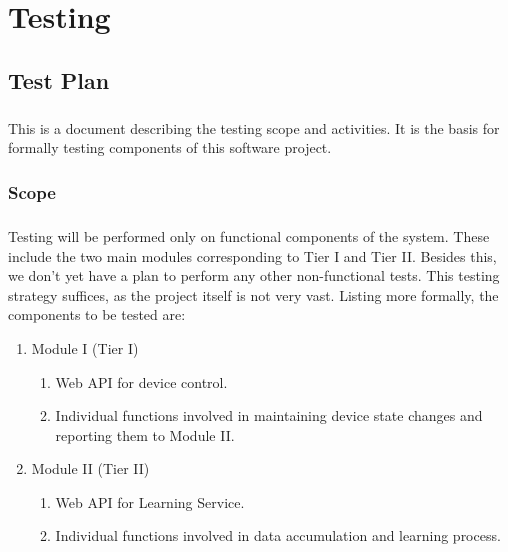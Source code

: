 \chapter{Testing}


\section{Test Plan}
\paragraph{}
This is a document describing the testing scope and activities. It is the basis for formally testing components of this software project.
%
\subsection{Scope}
\paragraph{}
Testing will be performed only on functional components of the system. These include the two main modules corresponding to Tier I and Tier II. Besides this, we don't yet have a plan to perform any other non-functional tests. This testing strategy suffices, as the project itself is not very vast. Listing more formally, the components to be tested are:
\begin{enumerate}
\item Module I (Tier I)
	\begin{enumerate}
	\item Web API for device control.
	\item Individual functions involved in maintaining device state changes and reporting them to Module II.
	\end{enumerate}
\item Module II (Tier II)
	\begin{enumerate}
	\item Web API for Learning Service.
	\item Individual functions involved in data accumulation and learning process.
	\end{enumerate}
\end{enumerate}

